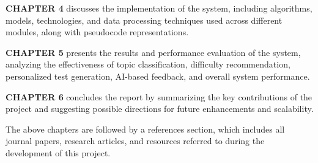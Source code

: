 \begin{sloppypar}
\textbf{CHAPTER 4} discusses the implementation of the system, including algorithms, models, technologies, and data processing techniques used across different modules, along with pseudocode representations.

\textbf{CHAPTER 5} presents the results and performance evaluation of the system, analyzing the effectiveness of topic classification, difficulty recommendation, personalized test generation, AI-based feedback, and overall system performance.

\textbf{CHAPTER 6} concludes the report by summarizing the key contributions of the project and suggesting possible directions for future enhancements and scalability.

The above chapters are followed by a references section, which includes all journal papers, research articles, and resources referred to during the development of this project.

\end{sloppypar}
